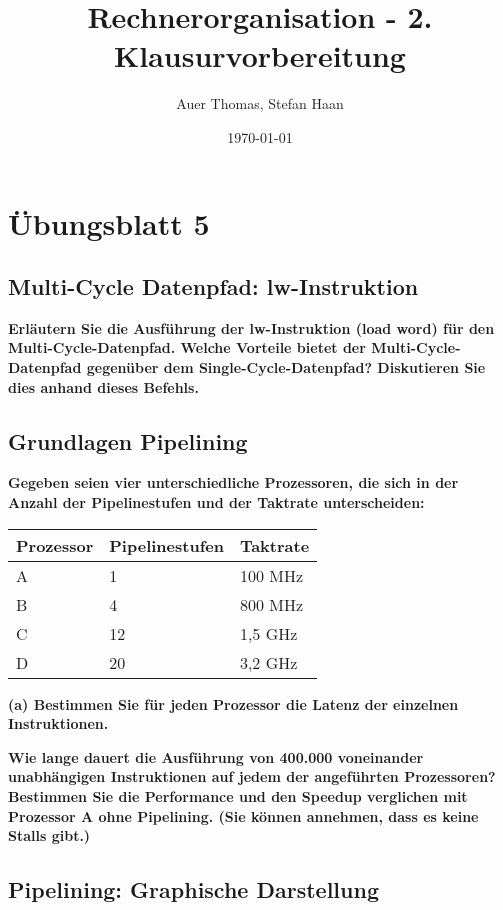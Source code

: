\documentclass[11pt]{article}
\title{Rechnerorganisation - 2. Klausurvorbereitung}
\author{Auer Thomas, Stefan Haan}
\date{\today}
\begin{document}
\maketitle
\tableofcontents
\graphicspath{{graphics/}}

\setcounter{section}{4}
\pagebreak

\section{Übungsblatt 5}
    \subsection{Multi-Cycle Datenpfad: lw-Instruktion}
    \textbf{Erläutern Sie die Ausführung der lw-Instruktion (load word) für den Multi-Cycle-Datenpfad.
    Welche Vorteile bietet der Multi-Cycle-Datenpfad gegenüber dem Single-Cycle-Datenpfad?
    Diskutieren Sie dies anhand dieses Befehls.}


    \subsection{Grundlagen Pipelining}
    \textbf{Gegeben seien vier unterschiedliche Prozessoren, die sich in der Anzahl der Pipelinestufen und
    der Taktrate unterscheiden:\\}
    \begin{center}
        \begin{tabular}{l|l|l}
        Prozessor & Pipelinestufen & Taktrate \\\hline
        A & 1 & 100 MHz \\
        B & 4 & 800 MHz \\
        C & 12 & 1,5 GHz \\
        D & 20 & 3,2 GHz \\
        \end{tabular}
    \end{center}
    \textbf{(a) Bestimmen Sie für jeden Prozessor die Latenz der einzelnen Instruktionen.}
    
    \textbf{Wie lange dauert die Ausführung von 400.000 voneinander unabhängigen Instruktionen
    auf jedem der angeführten Prozessoren? Bestimmen Sie die Performance und den
    Speedup verglichen mit Prozessor A ohne Pipelining. (Sie können annehmen, dass es
    keine Stalls gibt.)}

    \subsection{Pipelining: Graphische Darstellung}
\end{document}
